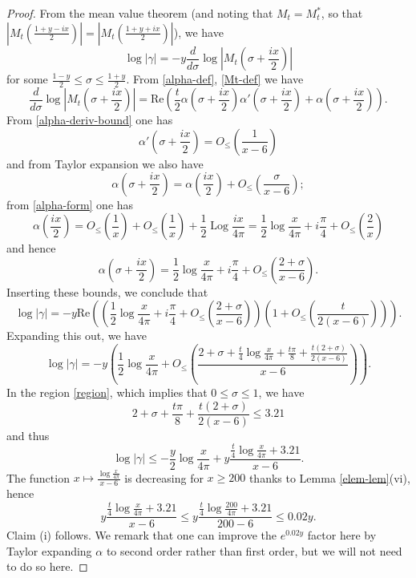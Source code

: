\documentclass[a4paper,11pt,twoside]{amsart}
\newcommand\Log{{\operatorname{Log}}}
\begin{document}
\begin{proof}
From the mean value theorem (and noting that $M_t = M_t^*$, so that $\left|M_t\left(\frac{1+y-ix}{2}\right)\right| = \left|M_t\left(\frac{1+y+ix}{2}\right)\right|$), we have
$$ \log|\gamma| = -y \frac{d}{d\sigma} \log \left|M_t\left( \sigma + \frac{ix}{2}\right)\right| $$
for some $\frac{1-y}{2} \leq \sigma \leq \frac{1+y}{2}$.  From \eqref{alpha-def}, \eqref{Mt-def} we have
$$ \frac{d}{d\sigma} \log \left|M_t\left( \sigma + \frac{ix}{2}\right)\right| = \mathrm{Re}\left( \frac{t}{2} \alpha\left(\sigma+\frac{ix}{2}\right) \alpha'\left(\sigma+\frac{ix}{2}\right) + \alpha\left(\sigma+\frac{ix}{2}\right) \right).$$
From \eqref{alpha-deriv-bound} one has
\begin{equation}\label{alphap-b}
 \alpha'\left(\sigma+\frac{ix}{2}\right) = O_{\leq}\left( \frac{1}{x-6} \right)
\end{equation}
and from Taylor expansion we also have
$$ \alpha(\sigma+\frac{ix}{2}) = \alpha\left(\frac{ix}{2}\right) + O_{\leq}\left( \frac{\sigma}{x-6} \right);$$
from \eqref{alpha-form} one has
$$ \alpha\left(\frac{ix}{2}\right) = O_{\leq}\left(\frac{1}{x}\right) + O_{\leq}\left(\frac{1}{x}\right) + \frac{1}{2} \Log \frac{ix}{4\pi} 
= \frac{1}{2} \log \frac{x}{4\pi} + i \frac{\pi}{4} + O_{\leq}\left( \frac{2}{x} \right) $$
and hence
\begin{equation}\label{asig}
 \alpha(\sigma+\frac{ix}{2}) = \frac{1}{2} \log \frac{x}{4\pi} + i \frac{\pi}{4} + O_{\leq}\left( \frac{2+\sigma}{x-6} \right).
\end{equation}
Inserting these bounds, we conclude that
$$ \log|\gamma| = -y \mathrm{Re} \left( \left(\frac{1}{2} \log \frac{x}{4\pi} + i \frac{\pi}{4} + O_{\leq}\left( \frac{2+\sigma}{x-6} \right)\right) \left(1 + O_{\leq}\left(\frac{t}{2(x-6)}\right)\right) \right).$$
Expanding this out, we have
$$ \log|\gamma| = -y \left(\frac{1}{2} \log \frac{x}{4\pi} + O_{\leq}\left( \frac{2+\sigma + \frac{t}{4} \log \frac{x}{4\pi} + \frac{t\pi}{8} + \frac{t(2+\sigma)}{2(x-6)}}{x-6} \right)\right).$$
In the region \eqref{region}, which implies that $0 \leq \sigma \leq 1$, we have
$$ 2 + \sigma + \frac{t\pi}{8} + \frac{t(2+\sigma)}{2(x-6)} \leq 3.21$$
and thus
$$ \log|\gamma| \leq -\frac{y}{2} \log \frac{x}{4\pi} + y \frac{\frac{t}{4} \log \frac{x}{4\pi} + 3.21}{x-6}.$$
The function $x \mapsto \frac{\log \frac{x}{4\pi}}{x-6}$ is decreasing for $x \geq 200$ thanks to Lemma \ref{elem-lem}(vi), hence
$$ y \frac{\frac{t}{4} \log \frac{x}{4\pi} + 3.21}{x-6} \leq y \frac{\frac{t}{4} \log \frac{200}{4\pi} + 3.21}{200-6} \leq 0.02 y.$$
Claim (i) follows.  We remark that one can improve the $e^{0.02 y}$ factor here by Taylor expanding $\alpha$ to second order rather than first order, but we will not need to do so here.


\end{proof}
\end{document}
